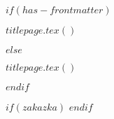 

$if(has-frontmatter)$
  \begin{frontmatter}
  \begin{titlepage}
  $titlepage.tex()$
  \end{titlepage}
  \end{frontmatter}
$else$
  \begin{titlepage}
  $titlepage.tex()$
  \end{titlepage}
$endif$


$if(zakazka)$
$endif$


\newpage
 \tableofcontents
\newpage

